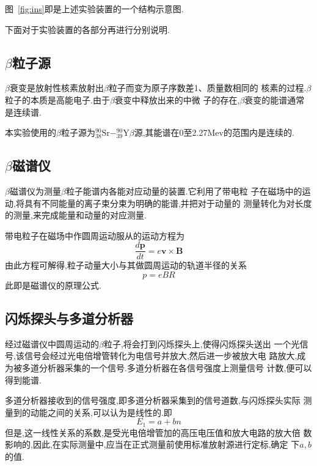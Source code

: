 \documentclass[aps,pre,12pt,preprint,onecolumn,showpacs,showkeys]{revtex4-1}
\begin{document}
图~\ref{fig:ins}即是上述实验装置的一个结构示意图.

下面对于实验装置的各部分再进行分别说明.

\subsection{$\beta$粒子源}

$\beta$衰变是放射性核素放射出$\beta$粒子而变为原子序数差1、质量数相同的
核素的过程.$\beta$粒子的本质是高能电子.由于$\beta$衰变中释放出来的中微
子的存在,$\beta$衰变的能谱通常是连续谱.

本实验使用的$\beta$粒子源为$^{90}_{38}\text{Sr} -
^{90}_{39}\text{Y}\beta$源,其能谱在0至2.27Mev的范围内是连续的.\cite{Book}

\subsection{$\beta$磁谱仪}

$\beta$磁谱仪为测量$\beta$粒子能谱内各能对应动量的装置.它利用了带电粒
子在磁场中的运动,将具有不同能量的离子束分束为明确的能谱,并把对于动量的
测量转化为对长度的测量,来完成能量和动量的对应测量.

带电粒子在磁场中作圆周运动服从的运动方程为
\begin{equation}
  \label{eq:Beq}
  \frac{d\bm{p}}{dt} = e\bm{v}\times\bm{B}
\end{equation}
由此方程可解得,粒子动量大小与其做圆周运动的轨道半径的关系
\begin{equation}
  \label{eq:p-R}
  p = eBR
\end{equation}
此即是磁谱仪的原理公式.

\subsection{闪烁探头与多道分析器}

经过磁谱仪中圆周运动的$\beta$粒子,将会打到闪烁探头上,使得闪烁探头送出
一个光信号,该信号会经过光电倍增管转化为电信号并放大,然后进一步被放大电
路放大,成为被多道分析器采集的一个信号.多道分析器在各信号强度上测量信号
计数,便可以得到能谱.

多道分析器接收到的信号强度,即多道分析器采集到的信号道数,与闪烁探头实际
测量到的动能之间的关系,可以认为是线性的.即
\begin{equation}
  \label{eq:E-n}
  E_1 = a + bn
\end{equation}
但是,这一线性关系的系数,是受光电倍增管加的高压电压值和放大电路的放大倍
数影响的,因此,在实际测量中,应当在正式测量前使用标准放射源进行定标,确定
下$a,b$的值.
\end{document}
